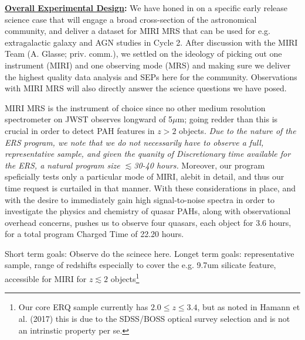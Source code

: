 \smallskip \smallskip
\noindent


\smallskip \smallskip
\noindent
{\bf \underline{Overall Experimental Design}:} 
We have honed in on a specific early release science case that will
engage a broad cross-section of the astronomical community, and
deliver a dataset for MIRI MRS that can be used for e.g. extragalactic
galaxy and AGN studies in Cycle 2.  After discussion with the MIRI
Team (A. Glasse; priv. comm.), we settled on the ideology of picking
out one instrument (MIRI) and one observing mode (MRS) and making sure
we deliver the highest quality data analysis and SEPs here for the
community. Observations with MIRI MRS will also directly answer the
science questions we have posed.

\smallskip \smallskip
\noindent
MIRI MRS is the instrument of choice since no other medium resolution
spectrometer on JWST observes longward of 5$\mu$m; going redder than
this is crucial in order to detect PAH features in $z > 2$
objects. 
{\it Due to the nature of the ERS program, we note that we do not 
necessarily have to observe a full, representative sample, 
and given the quanity of Discretionary time available for the ERS, 
a natural program size $\lesssim$30-40 hours.} 
Moreover, our program speficially tests only a particular mode of 
MIRI, alebit in detail, and thus our time request is curtailed in that manner. 
With these considerations in place, and with the desire to immediately gain high signal-to-noise spectra
in order to investigate the physics and chemistry of quasar PAHs,
along with observational overhead concerns, pushes us to observe four 
quasars, each object for 3.6 hours, for a total program Charged Time of 22.20 hours.

\smallskip \smallskip
\noindent
Short term goals: Observe do the scinece here. 
Longet term goals: representative sample, range of redshifts 
especially to cover the e.g. 9.7um  silicate feature, accessible for MIRI 
for $z\lesssim2$ objects\footnote{Our core ERQ sample currently 
has $2.0 \leq z \leq3.4$, but as noted in Hamann et al. (2017) this
is due to the SDSS/BOSS optical survey selection and is not an intrinstic 
property per se.}

